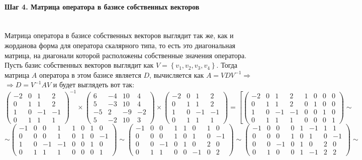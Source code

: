 \documentclass{article}
\begin{document}
\paragraph*{Шаг 4. Матрица оператора в базисе собственных векторов} \, \\
Матрица оператора в базисе собственных векторов выглядит так же, как и жорданова форма для оператора скалярного типа, то есть это диагональная матрица, на диагонали которой расположены собственные значения оператора. Пусть базис собственных векторов выглядит как $V = \left\{v_1, v_2, v_3, v_4\right\}$. Тогда матрица $A$ оператора в этом базисе является $D$, вычисляется как $A = VDV^{-1} \Rightarrow$\\ $\Rightarrow D = V^{-1}AV$ и будет выглядеть вот так:
$$\begin{pmatrix}
-2 & 0 & 1 & 2 \\
0 & 1 & 1 & 2 \\
1 & 0 & -1 & -1 \\
0 & 1 & 1 & 1
\end{pmatrix}^{-1}\times \begin{pmatrix}
6 & -4 & 10 & 4 \\
5 & -3 & 10 & 4 \\
-5 & 2 & -9 & -2 \\
5 & -2 & 10 & 3
\end{pmatrix} \times \begin{pmatrix}
-2 & 0 & 1 & 2 \\
0 & 1 & 1 & 2 \\
1 & 0 & -1 & -1 \\
0 & 1 & 1 & 1
\end{pmatrix} = \left[\left(\begin{array}{cccc|cccc}
-2 & 0 & 1 & 2 & 1 & 0 & 0 & 0\\
0 & 1 & 1 & 2 & 0 & 1 & 0 & 0\\
1 & 0 & -1 & -1 & 0 & 0 & 1 & 0\\
0 & 1 & 1 & 1 & 0 & 0 & 0 & 1
\end{array}\right) \sim\right.$$
$$\left.\sim \left(\begin{array}{cccc|cccc}
-1 & 0 & 0 & 1 & 1 & 0 & 1 & 0\\
0 & 0 & 0 & 1 & 0 & 1 & 0 & -1\\
1 & 0 & -1 & -1 & 0 & 0 & 1 & 0\\
0 & 1 & 1 & 1 & 0 & 0 & 0 & 1
\end{array}\right) \sim \left(\begin{array}{cccc|cccc}
-1 & 0 & 0 & 1 & 1 & 0 & 1 & 0\\
0 & 0 & 0 & 1 & 0 & 1 & 0 & -1\\
0 & 0 & -1 & 0 & 1 & 0 & 2 & 0\\
0 & 1 & 1 & 0 & 0 & -1 & 0 & 2
\end{array}\right) \sim \left(\begin{array}{cccc|cccc}
-1 & 0 & 0 & 0 & 1 & -1 & 1 & 1\\
0 & 0 & 0 & 1 & 0 & 1 & 0 & -1\\
0 & 0 & -1 & 0 & 1 & 0 & 2 & 0\\
0 & 1 & 0 & 0 & 1 & -1 & 2 & 2
\end{array}\right) \sim \right.$$
\end{document}
